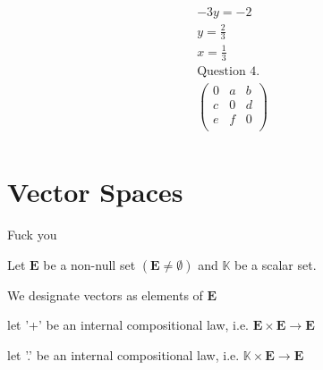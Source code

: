 \documentclass{article}
\begin{document}
\begin{align*}
    -3y = -2                                   \\
    y = \frac{2}{3}                            \\
    x = \frac{1}{3}                            \\
    \textrm{Question 4.}                       \\
    \begin{pmatrix}
        0 & a & b \\
        c & 0 & d \\
        e & f & 0 \\
    \end{pmatrix} \\
\end{align*}

\section{Vector Spaces}

Fuck you

Let $\mathbf{E}$ be a non-null set $ (\mathbf{E} \neq \emptyset) $ and $ \mathbb{K}$ be a scalar set.

We designate vectors as elements of $\mathbf{E}$

let '+' be an internal compositional law, i.e. $ \mathbf{E} \times \mathbf{E} \rightarrow \mathbf{E}$

let '.' be an internal compositional law, i.e. $ \mathbb{K} \times \mathbf{E} \rightarrow \mathbf{E}$
\end{document}
